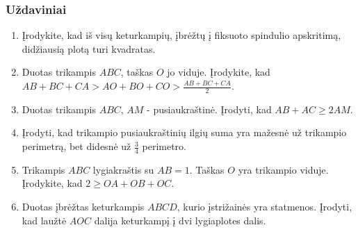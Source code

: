 \subsubsection{Uždaviniai}

\begin{enumerate}
\item Įrodykite, kad iš visų keturkampių, įbrėžtų į fiksuoto
  spindulio apskritimą, didžiausią plotą turi kvadratas.
\item Duotas trikampis $ABC$, taškas $O$ jo viduje.
  Įrodykite, kad $AB+BC+CA>AO+BO+CO> \frac{AB+BC+CA}{2}$.
\item Duotas trikampis $ABC$, $AM$ - pusiaukraštinė. Įrodyti,
  kad $AB + AC \geq 2AM$.
\item Įrodyti, kad trikampio pusiaukraštinių ilgių suma yra
  mažesnė už trikampio perimetrą, bet didesnė už
  $\frac{3}{4}$ perimetro.
\item Trikampis $ABC$ lygiakraštis su $AB=1$. Taškas $O$ yra
  trikampio viduje. Įrodykite, kad $2\geq OA+OB+OC$.
\item Duotas įbrėžtas keturkampis $ABCD$, kurio įstrižainės
  yra statmenos. Įrodyti, kad laužtė $AOC$ dalija keturkampį
  į dvi lygiaplotes dalis.

\end{enumerate}
